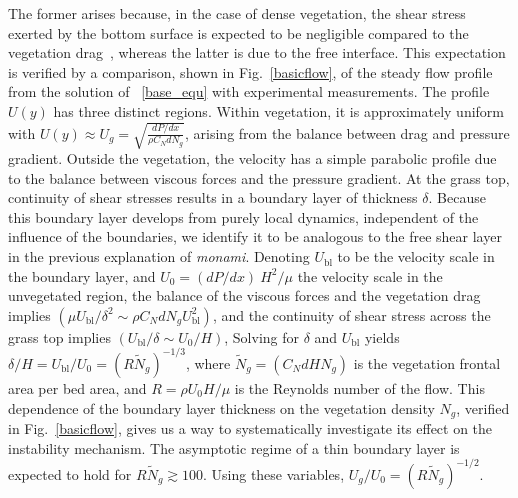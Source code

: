 \documentclass[aps,prl,twocolumn,superscriptaddress,sort&compress,10pt]{revtex4-1}  %
\newcommand{\Rey}{{R}}
\newcommand{\Ndg}{\tilde{N}_g}
\newcommand{\monami}{\textit{monami}}
\newcommand{\ubl}{U_\text{bl}}
\begin{document}
The former arises because, in the case of dense vegetation, the shear stress exerted by the bottom surface is expected to be negligible compared to the vegetation drag~\cite{Nepf00}, whereas the latter is due to the free interface. 
This expectation is verified by a comparison, shown in Fig.~\ref{basicflow}, of the steady flow profile from the solution of ~\eqref{base_equ} with experimental measurements.
The profile $U(y)$ has three distinct regions.
Within vegetation, it is approximately uniform with $ U(y) \approx U_g = \sqrt{\frac{dP/dx}{\rho C_N dN_g}}$, arising from the balance between drag and pressure gradient. 
Outside the vegetation, the velocity has a simple parabolic profile due to the balance between viscous forces and the pressure gradient. 
At the grass top, continuity of shear stresses results in a boundary layer of thickness $\delta$. 
Because this boundary layer develops from purely local dynamics, independent of the influence of the boundaries, we identify it to be analogous to the free shear layer \cite{Ghisal02,Nepf04} in the previous explanation of \monami.
Denoting $\ubl$ to be the velocity scale in the boundary layer, and $U_0 = {(dP/dx)~H^2}/{\mu}$ the velocity scale in the unvegetated region, the balance of the viscous forces and the vegetation drag implies $(\mu \ubl/\delta^2 \sim \rho C_N d N_g \ubl^2)$, and the continuity of shear stress across the grass top implies $(\ubl/\delta \sim U_0/H)$,  
Solving for $\delta$ and $\ubl$ yields $\delta/H = \ubl/U_0=(\Rey\Ndg)^{-1/3}$, where $\Ndg = \left(C_N d H N_g\right)$ is the vegetation frontal area per bed area, and $\Rey=\rho U_0 H/\mu$ is the Reynolds number of the flow. 
This dependence of the boundary layer thickness on the vegetation density $N_g$, verified in Fig.~\ref{basicflow}, gives us a way to systematically investigate its effect on the instability mechanism.
The asymptotic regime of a thin boundary layer is expected to hold for $\Rey \Ndg \gtrsim 100$. Using these variables, $U_g/U_0 = (\Rey \Ndg)^{-1/2}$. 
\end{document}
